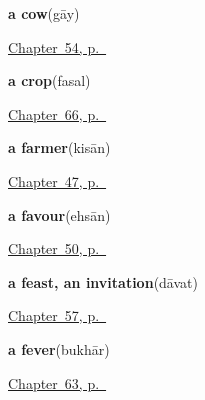 \noindent\begin{minipage}[t]{\linewidth}
\raggedright
\textbf{a cow}\enspace\emph{}\enspace(gāy)\par
\footnotesize \hyperref[ch:hi-animals]{Chapter~54, p.~\pageref*{ch:hi-animals}}
\end{minipage}\par\smallskip

\noindent\begin{minipage}[t]{\linewidth}
\raggedright
\textbf{a crop}\enspace\emph{}\enspace(fasal)\par
\footnotesize \hyperref[ch:hi-the-field-and-the-well]{Chapter~66, p.~\pageref*{ch:hi-the-field-and-the-well}}
\end{minipage}\par\smallskip

\noindent\begin{minipage}[t]{\linewidth}
\raggedright
\textbf{a farmer}\enspace\emph{}\enspace(kisān)\par
\footnotesize \hyperref[ch:hi-roles]{Chapter~47, p.~\pageref*{ch:hi-roles}}
\end{minipage}\par\smallskip

\noindent\begin{minipage}[t]{\linewidth}
\raggedright
\textbf{a favour}\enspace\emph{}\enspace(ehsān)\par
\footnotesize \hyperref[ch:hi-courtesy]{Chapter~50, p.~\pageref*{ch:hi-courtesy}}
\end{minipage}\par\smallskip

\noindent\begin{minipage}[t]{\linewidth}
\raggedright
\textbf{a feast, an invitation}\enspace\emph{}\enspace(dāvat)\par
\footnotesize \hyperref[ch:hi-a-gift-and-a-feast]{Chapter~57, p.~\pageref*{ch:hi-a-gift-and-a-feast}}
\end{minipage}\par\smallskip

\noindent\begin{minipage}[t]{\linewidth}
\raggedright
\textbf{a fever}\enspace\emph{}\enspace(bukhār)\par
\footnotesize \hyperref[ch:hi-what-the-body-tells-you]{Chapter~63, p.~\pageref*{ch:hi-what-the-body-tells-you}}
\end{minipage}\par\smallskip

